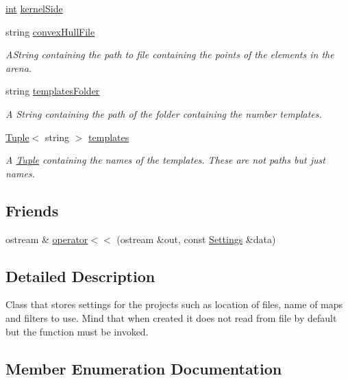 \begin{DoxyCompactItemize}
\mbox{\hyperlink{draw_8hh_aa620a13339ac3a1177c86edc549fda9b}{int}} \mbox{\hyperlink{class_settings_a376418be10e2c1067b2d03c08e7b6a92}{kernel\+Side}}
\item 
string \mbox{\hyperlink{class_settings_aae9ea78e634fee8a76c2eb2b6fd09eeb}{convex\+Hull\+File}}
\begin{DoxyCompactList}\small\item\em A\+String containing the path to file containing the points of the elements in the arena. \end{DoxyCompactList}\item 
string \mbox{\hyperlink{class_settings_a3c272482637bc9c3a534e08e75157830}{templates\+Folder}}
\begin{DoxyCompactList}\small\item\em A String containing the path of the folder containing the number templates. \end{DoxyCompactList}\item 
\mbox{\hyperlink{class_tuple}{Tuple}}$<$ string $>$ \mbox{\hyperlink{class_settings_add9f0e9a114013a3295ba056e19d991f}{templates}}
\begin{DoxyCompactList}\small\item\em A \mbox{\hyperlink{class_tuple}{Tuple}} containing the names of the templates. These are not paths but just names. \end{DoxyCompactList}\end{DoxyCompactItemize}
\subsection*{Friends}
\begin{DoxyCompactItemize}
\item 
ostream \& \mbox{\hyperlink{class_settings_ae9bfb3fa2d38f0ebe2e74b782790da98}{operator$<$$<$}} (ostream \&out, const \mbox{\hyperlink{class_settings}{Settings}} \&data)
\end{DoxyCompactItemize}


\subsection{Detailed Description}
Class that stores settings for the projects such as location of files, name of maps and filters to use. Mind that when created it does not read from file by default but the function must be invoked. 

\subsection{Member Enumeration Documentation}
\mbox{\label{class_settings_a30d85f2e06a54ae9bc8da2d01037658f}} 
